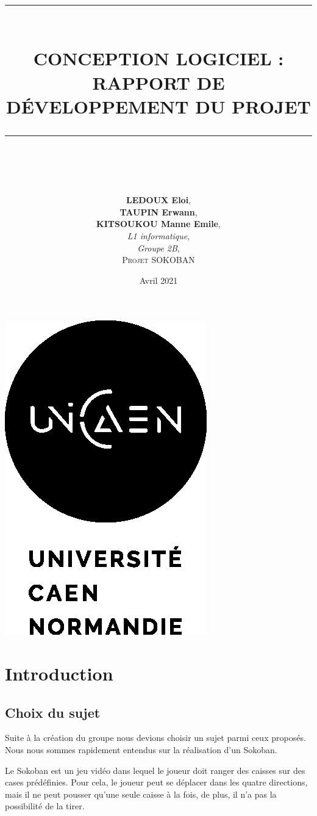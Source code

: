 \documentclass[a4paper,12pt]{article} %
\author{
	\textbf{LEDOUX Eloi},\\
	\textbf{TAUPIN Erwann},\\
	\textbf{KITSOUKOU Manne Emile},\\
	\emph{L1 informatique},\\
	\emph{Groupe 2B},\\
	\textsc{Projet SOKOBAN}\\}
\date{Avril 2021}
\title{
	\rule{0.75\textwidth}{2pt}\\
	\textbf{CONCEPTION LOGICIEL :\\ RAPPORT DE DÉVELOPPEMENT DU PROJET} 
	\rule{0.75\textwidth}{2pt}\\}
\begin{document}
\maketitle
\begin{center}
\includegraphics[scale=1]{images/LogoUNICAEN.png}\\
\end{center}
\thispagestyle{empty}
\newpage

\renewcommand{\contentsname}{Sommaire}
\tableofcontents
\thispagestyle{empty}
\newpage

\section{Introduction}
\setcounter{page}{1}
\onehalfspacing

\subsection{Choix du sujet}
Suite à la création du groupe nous devions choisir un sujet parmi ceux proposés. Nous nous sommes rapidement entendus sur la réalisation d'un Sokoban.
 
Le Sokoban est un jeu vidéo dans lequel le joueur doit ranger des caisses sur des cases prédéfinies. Pour cela, le joueur peut se déplacer dans les quatre directions, mais il ne peut pousser qu'une seule caisse à la fois, de plus, il n'a pas la possibilité de la tirer.
\end{document}
